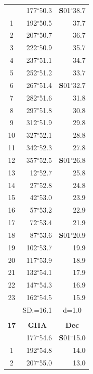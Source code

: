 \documentclass[10pt, a4paper]{report}
\begin{document}
\begin{scriptsize}
\begin{tabular*}{0.2\textwidth}[t]{@{\extracolsep{\fill}}|c|rr|}
\hline\rule{0pt}{2.6ex}\noindent
0 & 177$^\circ$50.3 & \textbf{S}01$^\circ$38.7\\
1 & 192$^\circ$50.5 & 37.7\\
2 & 207$^\circ$50.7 & 36.7\\
3 & 222$^\circ$50.9 & \raisebox{0.24ex}{\boldmath$\cdot$~\boldmath$\cdot$~~}35.7\\
4 & 237$^\circ$51.1 & 34.7\\
5 & 252$^\circ$51.2 & 33.7\\[2Pt]
6 & 267$^\circ$51.4 & \textbf{S}01$^\circ$32.7\\
7 & 282$^\circ$51.6 & 31.8\\
8 & 297$^\circ$51.8 & 30.8\\
9 & 312$^\circ$51.9 & \raisebox{0.24ex}{\boldmath$\cdot$~\boldmath$\cdot$~~}29.8\\
10 & 327$^\circ$52.1 & 28.8\\
11 & 342$^\circ$52.3 & 27.8\\[2Pt]
12 & 357$^\circ$52.5 & \textbf{S}01$^\circ$26.8\\
13 & 12$^\circ$52.7 & 25.8\\
14 & 27$^\circ$52.8 & 24.8\\
15 & 42$^\circ$53.0 & \raisebox{0.24ex}{\boldmath$\cdot$~\boldmath$\cdot$~~}23.9\\
16 & 57$^\circ$53.2 & 22.9\\
17 & 72$^\circ$53.4 & 21.9\\[2Pt]
18 & 87$^\circ$53.6 & \textbf{S}01$^\circ$20.9\\
19 & 102$^\circ$53.7 & 19.9\\
20 & 117$^\circ$53.9 & 18.9\\
21 & 132$^\circ$54.1 & \raisebox{0.24ex}{\boldmath$\cdot$~\boldmath$\cdot$~~}17.9\\
22 & 147$^\circ$54.3 & 16.9\\
23 & 162$^\circ$54.5 & 15.9\\
\hline
\rule{0pt}{2.4ex} & \multicolumn{1}{c}{SD.=16.1} & \multicolumn{1}{c|}{d=1.0}\\
\hline
\multicolumn{1}{c}{}\\[-0.5ex]\hline
\multicolumn{1}{|c|}{\rule{0pt}{2.6ex}\textbf{17}} & \multicolumn{1}{c}{\textbf{GHA}} & \multicolumn{1}{c|}{\textbf{Dec}}\\
\hline\rule{0pt}{2.6ex}\noindent
0 & 177$^\circ$54.6 & \textbf{S}01$^\circ$15.0\\
1 & 192$^\circ$54.8 & 14.0\\
2 & 207$^\circ$55.0 & 13.0\\

\end{tabular*}
\end{scriptsize}
\end{document}
